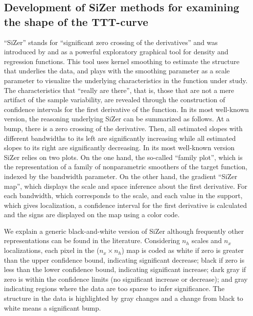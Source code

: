\documentclass[preprint,12pt]{elsarticle}
\begin{document}
\subsection{Development of SiZer methods for examining the shape of the TTT-curve}
 
``SiZer'' stands for ``significant zero crossing of the derivatives'' and was introduced by \cite{CM99} and \cite{CM02} as a powerful exploratory graphical tool for density and regression functions. This tool uses kernel smoothing to estimate the structure that underlies the data, and plays with the smoothing parameter as a scale parameter to visualize the underlying characteristics in the function under study. The characteristics that ``really are there'', that is, those that are not a mere artifact of the sample variability, are revealed through the construction of confidence intervals for the first derivative of the function.
In its most well-known version, the reasoning underlying SiZer can be summarized as follows. At a bump, there is a zero crossing of the derivative. Then, all estimated slopes with different bandwidths to its left are significantly increasing while all estimated slopes to its right are significantly decreasing. In its most well-known version SiZer relies on two plots.
On the one hand, the so-called ``family plot'', which is the representation of a family of nonparametric smoothers of the target function, indexed by the bandwidth parameter. 
On the other hand, the gradient ``SiZer map'', which displays the scale and space inference about the first derivative. For each bandwidth, which corresponds to the scale,  and each value in the support, which gives localization, a confidence interval for the first derivative is calculated and the signs are displayed on the map using a color code. 

We explain a generic black-and-white version of SiZer although frequently other representations can be found in the literature.
Considering $n_h$ scales and $n_x$ localizations, each pixel in the ($n_x \times n_h$) map is coded as white if zero is greater than the upper confidence bound, indicating significant decrease;  black  if zero is less than the lower confidence bound, indicating significant increase; dark gray  if zero is within the confidence limits (no significant increase or decrease); and gray indicating regions where the data are too sparse to infer significance. 
The structure in the data is highlighted by gray changes and a change from black to white  means a significant bump. 
\end{document}
